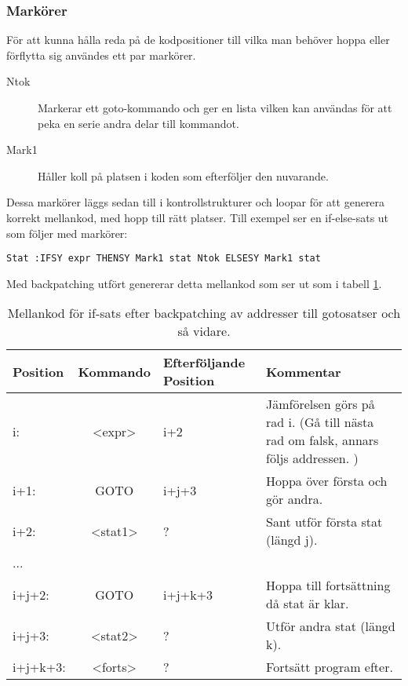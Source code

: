 		\subsubsection{Markörer}
			För att kunna hålla reda på de kodpositioner till vilka man behöver hoppa eller
			förflytta sig användes ett par markörer.

			\begin{description}
				\item[Ntok]	 Markerar ett goto-kommando och ger en lista vilken kan användas för att peka en serie andra delar till kommandot.
				\item[Mark1] Håller koll på platsen i koden som efterföljer den nuvarande.
			\end{description}

			Dessa markörer läggs sedan till i kontrollstrukturer och loopar för att generera korrekt mellankod, med hopp till rätt platser. Till exempel ser en if-else-sats ut som följer med markörer: 
			
\begin{verbatim}
Stat :IFSY expr THENSY Mark1 stat Ntok ELSESY Mark1 stat
\end{verbatim}

			Med backpatching utfört genererar detta mellankod som ser ut som i tabell \ref{Tab:if}.
			
\begin{table}[!htbp]
	\centering
	\begin{tabular}{ l | c | p{} | p{} }
\textbf{Position} & \textbf{Kommando} & \textbf{Efterföljande Position} & \textbf{Kommentar} \\ \hline
i:  &     <expr>   &  i+2 & Jämförelsen görs på rad i. (Gå till nästa rad om falsk, annars följs addressen. ) \\
i+1:   &  GOTO    &   i+j+3 &      Hoppa över första och gör andra. \\
i+2:   &  <stat1>  &  ? 	&     Sant utför första stat (längd j). \\
... &&&\\
i+j+2:  & GOTO    &   i+j+k+3  & Hoppa till fortsättning då stat är klar. \\
i+j+3:  & <stat2>  &  ?      &   Utför andra stat (längd k). \\
i+j+k+3:& <forts>  &  ?      &   Fortsätt program efter. \\
	\end{tabular}
	\caption{Mellankod för if-sats efter backpatching av addresser till gotosatser och så vidare.}
	\label{Tab:if}
\end{table}
		
